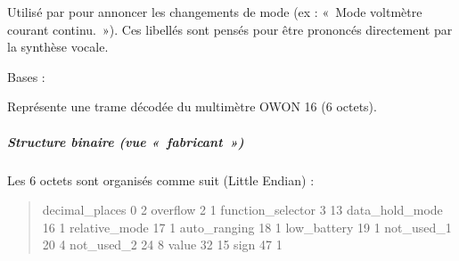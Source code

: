 \documentclass[letterpaper,10pt,french]{sphinxmanual}
\begin{document}
\begin{fulllineitems}
\sphinxAtStartPar
Utilisé par  pour annoncer les changements de mode
(ex : « Mode voltmètre courant continu. »). Ces libellés sont pensés pour
être prononcés directement par la synthèse vocale.

\end{fulllineitems}


\begin{fulllineitems}
\label{\detokenize{api/hardware.devices:hardware.devices.owon_multimeter.OwonMultimeterData}}
\pysigstartsignatures
\pysiglinewithargsret
{}
{\sphinxparamcomma {}\sphinxparamcomma {}\sphinxparamcomma {}\sphinxparamcomma {}\sphinxparamcomma {}\sphinxparamcomma {}\sphinxparamcomma {}\sphinxparamcomma {}\sphinxparamcomma {}\sphinxparamcomma {}}
{}
\pysigstopsignatures
\sphinxAtStartPar
Bases : 

\sphinxAtStartPar
Représente une trame décodée du multimètre OWON 16 (6 octets).


\subparagraph{Structure binaire (vue « fabricant »)}
\label{\detokenize{api/hardware.devices:structure-binaire-vue-fabricant}}
\sphinxAtStartPar
Les 6 octets sont organisés comme suit (Little Endian) :
\begin{quote}

\sphinxAtStartPar
decimal\_places          0           2
overflow                2           1
function\_selector       3          13
data\_hold\_mode         16           1
relative\_mode          17           1
auto\_ranging           18           1
low\_battery            19           1
not\_used\_1             20           4
not\_used\_2             24           8
value                  32          15
sign                   47           1
\end{quote}



\end{fulllineitems}
\end{document}
